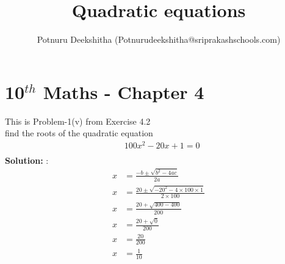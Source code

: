\documentclass[12pt]{article}
\title{Quadratic equations}
\author{Potnuru Deekshitha (Potnurudeekshitha@sriprakashschools.com)}
\newcommand{\solution}{\noindent \textbf{Solution: }}
\begin{document}
\section*{10$^{th}$ Maths - Chapter 4}
This is Problem-1(v) from Exercise 4.2\\
find the roots of the quadratic equation\\
\begin{align*}
&{100}x^2-{20} x +{1} = 0\\
\end{align*}
\solution:\\
\begin{align*}
x &=\frac{-b\pm\sqrt{b^2-4ac}}{2a}\\
x &=\frac{20\pm\sqrt{-20^2-4 \times 100\times1}}{2 \times 100}\\
x &=\frac{20+\sqrt{400-400}}{200}\\
x &=\frac{20+\sqrt{0}}{200}\\
x &=\frac{20}{200}\\
x &=\frac{1}{10}
\end{align*}
\end{document}
